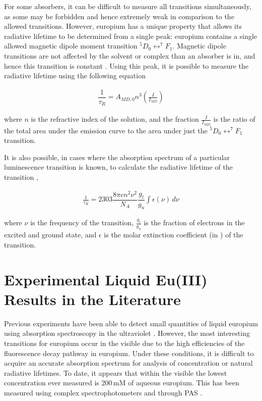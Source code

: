 For some absorbers, it can be difficult to measure all transitions
simultaneously, as some may be forbidden and hence extremely weak in comparison
to the allowed transitions. However, europium has a unique property that allows
its radiative lifetime to be determined from a single peak: europium contains a
single allowed magnetic dipole moment transition $^5D_0 \leftrightarrow ^7F_1$.
Magnetic dipole transitions are not affected by the solvent or complex than an
absorber is in, and hence this transition is constant \cite{Werts:2002fs}.
Using this peak, it is possible to measure the radiative lifetime using the
following equation

\begin{align}
  \dfrac{1}{\tau_R} = A_{MD,0}n^3\left(\frac{I}{I_{MD}}\right) \label{eq:nat_life_eu}
\end{align}

where $n$ is the refractive index of the solution, and the fraction
$\frac{I}{I_{MD}}$ is the ratio of the total area under the emission curve to
the area under just the $^5D_0 \leftrightarrow ^7F_1$ transition.

It is also possible, in cases where the absorption spectrum of a particular
luminescence transition is known, to calculate the radiative lifetime of the
transition \cite{Lewis:1945tp},

\begin{align}
  \frac{1}{\tau_R} = 2303 \dfrac{8\pi c n ^2 \nu^2}{N_A}\dfrac{g_l}{g_u}\int\epsilon(\nu)\,d\nu \label{eq:nat_life_abs}
\end{align}

where $\nu$ is the frequency of the transition, $\tfrac{g_l}{g_u}$ is the
fraction of electrons in the excited and ground state, and $\epsilon$ is the
molar extinction coefficient (in \iM\icm) of the transition.



\section{Experimental Liquid Eu(III) Results in the Literature}\label{sec:previous_eu_results}

Previous experiments have been able to detect small quantities of liquid
europium using absorption spectroscopy in the ultraviolet \cite{Yun:2001wc}.
However, the most interesting transitions for europium occur in the visible due
to the high efficiencies of the fluorescence decay pathway in europium. Under
these conditions, it is difficult to acquire an accurate absorption spectrum
for analysis of concentration or natural radiative lifetimes. To date, it
appears that within the visible the lowest concentration ever measured is
200\,mM of aqueous europium. This has been measured using complex
spectrophotometers and through \ac{PAS} \cite{Sawada:1979vca}.

